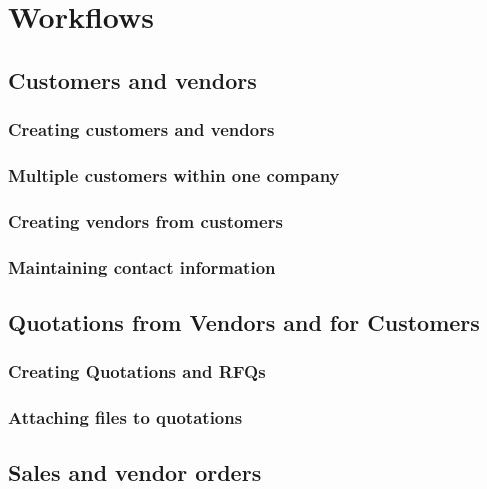 

\part{Workflows}
\label{part:Workflows}

\chapter{Customers and vendors}

\section{Creating customers and vendors}

\section{Multiple customers within one company}

\section{Creating vendors from customers}


\section{Maintaining contact information}


\chapter{Quotations from Vendors and for Customers}

\section{Creating Quotations and RFQs}

\section{Attaching files to quotations}
\label{sec:FileAttachments}


\chapter{Sales and vendor orders}
\label{cha:OrderManagement}

